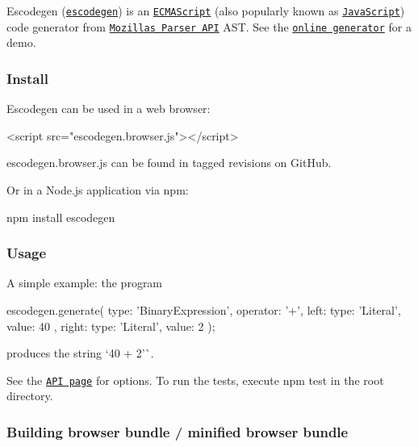\href{http://badge.fury.io/js/escodegen}{\tt } \href{http://travis-ci.org/estools/escodegen}{\tt } \href{https://david-dm.org/estools/escodegen}{\tt } \href{https://david-dm.org/estools/escodegen#info=devDependencies}{\tt }

Escodegen (\href{http://github.com/estools/escodegen}{\tt escodegen}) is an \href{http://www.ecma-international.org/publications/standards/Ecma-262.htm}{\tt E\+C\+M\+A\+Script} (also popularly known as \href{http://en.wikipedia.org/wiki/JavaScript}{\tt Java\+Script}) code generator from \href{https://developer.mozilla.org/en/SpiderMonkey/Parser_API}{\tt Mozilla\textquotesingle{}s Parser A\+PI} A\+ST. See the \href{https://estools.github.io/escodegen/demo/index.html}{\tt online generator} for a demo.

\subsubsection*{Install}

Escodegen can be used in a web browser\+: \begin{DoxyVerb}<script src="escodegen.browser.js"></script>
\end{DoxyVerb}


escodegen.\+browser.\+js can be found in tagged revisions on Git\+Hub.

Or in a Node.\+js application via npm\+: \begin{DoxyVerb}npm install escodegen
\end{DoxyVerb}


\subsubsection*{Usage}

A simple example\+: the program \begin{DoxyVerb}escodegen.generate({
    type: 'BinaryExpression',
    operator: '+',
    left: { type: 'Literal', value: 40 },
    right: { type: 'Literal', value: 2 }
});
\end{DoxyVerb}


produces the string `\textquotesingle{}40 + 2'\`{}.

See the \href{https://github.com/estools/escodegen/wiki/API}{\tt A\+PI page} for options. To run the tests, execute {\ttfamily npm test} in the root directory.

\subsubsection*{Building browser bundle / minified browser bundle}

